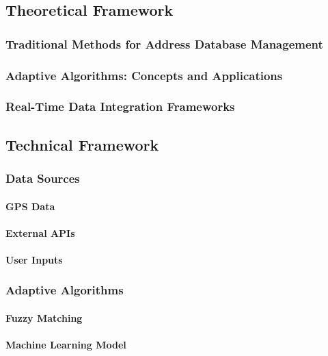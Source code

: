 \Author{\daAuthorOne}

\subsection{Theoretical Framework}

    \subsubsection{Traditional Methods for Address Database Management}

    \subsubsection{Adaptive Algorithms: Concepts and Applications}

    \subsubsection{Real-Time Data Integration Frameworks}

\blankLine

\subsection{Technical Framework}

    \subsubsection{Data Sources}
        \paragraph{GPS Data}
        \paragraph{External APIs}
        \paragraph{User Inputs}
    
    \subsubsection{Adaptive Algorithms}
        \paragraph{Fuzzy Matching}
        \paragraph{Machine Learning Model}
